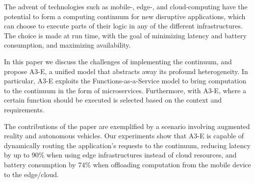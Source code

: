 The advent of technologies such as mobile-, edge-, and cloud-computing have the potential to form a computing continuum for new disruptive applications, which can choose to execute parts of their logic in any of the different infrastructures. The choice is made at run time, with the goal of minimizing latency and battery consumption, and maximizing availability.

In this paper we discuss the challenges of implementing the continuum, and propose A3-E, a unified model that abstracts away its profound heterogeneity. In particular, A3-E exploits the Functions-as-a-Service model to bring computation to the continuum in the form of microservices. Furthermore, with A3-E, where a certain function should be executed is selected based on the context and requirements.

The contributions of the paper are exemplified by a scenario involving augmented reality and autonomous vehicles. Our experiments show that A3-E is capable of dynamically routing the application's requests to the continuum, reducing latency by up to $90$\% when using edge infrastructures instead of cloud resources, and battery consumption by $74$\% when offloading computation from the mobile device to the edge/cloud.




